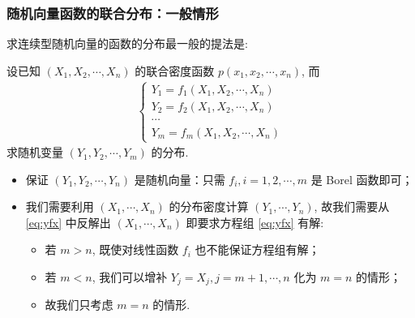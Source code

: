 \documentclass[Prob-All.tex]{subfiles}
\begin{document}
 \begin{frame}
 	\frametitle{随机向量函数的联合分布：一般情形}
 	求连续型随机向量的函数的分布最一般的提法是:

 	设已知 $(X_1,X_2,\cdots,X_n)$ 的联合密度函数 $p (x_1,x_2,\cdots, x_n)$, 而
 	\begin{eqnarray}
 		\label{eq:yfx}
 		\left\{
 		\begin{array}{l}
 			Y_1=f_1(X_1,X_2,\cdots,X_n)\\
 			Y_2=f_2(X_1,X_2,\cdots,X_n)\\
 			\cdots\\
 			Y_m=f_m(X_1,X_2,\cdots,X_n)
 		\end{array}
 		\right.
 	\end{eqnarray}
 	求随机变量 $(Y_1,Y_2,\cdots,Y_m)$ 的分布.

 	\pause
 	\begin{itemize}[<+-|alert@+>]
 		\item 保证 $(Y_1,Y_2,\cdots, Y_n)$ 是随机向量：只需 $f_i, i=1,2,\cdots, m$ 是 Borel 函数即可；
 		\item 我们需要利用 $(X_1,\cdots, X_n)$ 的分布密度计算 $(Y_1,\cdots,Y_n)$, 故我们需要从 \eqref{eq:yfx} 中反解出 $(X_1,\cdots,X_n)$ 即要求方程组 \eqref{eq:yfx} 有解:
 		\begin{itemize}
 			\item 若 $m>n$, 既使对线性函数 $f_i$ 也不能保证方程组有解；
 			\item 若 $m<n$, 我们可以增补 $Y_j=X_j, j=m+1,\cdots, n$ 化为 $m=n$ 的情形；
 			\item 故我们只考虑 $m=n$ 的情形.
 		\end{itemize}

 	\end{itemize}

 \end{frame}
\end{document}

